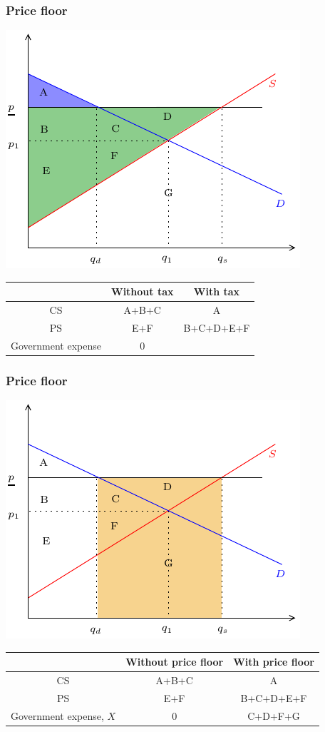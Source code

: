 \documentclass[xcolor=pdftex,dvipsnames]{beamer}
\begin{document}
\begin{frame}
\frametitle{Price floor}
\begin{center}
\includegraphics{pics/PriceFloorB}

\begin{tabular}{|c|c|c|}\hline &Without tax & With tax\\
\hline CS &A+B+C& A \\
\hline PS & E+F& B+C+D+E+F \\
\hline Government expense& 0 & 
\\
\hline
\end{tabular}
\end{center}
\end{frame}

\begin{frame}
\frametitle{Price floor}
\begin{center}
\includegraphics{pics/PriceFloorC}

\begin{tabular}{|c|c|c|}\hline &Without price floor & With price floor\\
\hline CS &A+B+C& A \\
\hline PS & E+F& B+C+D+E+F \\
\hline Government expense, $X$& 0 & C+D+F+G
\\
\hline
\end{tabular}
\end{center}
\end{frame}
\end{document}

